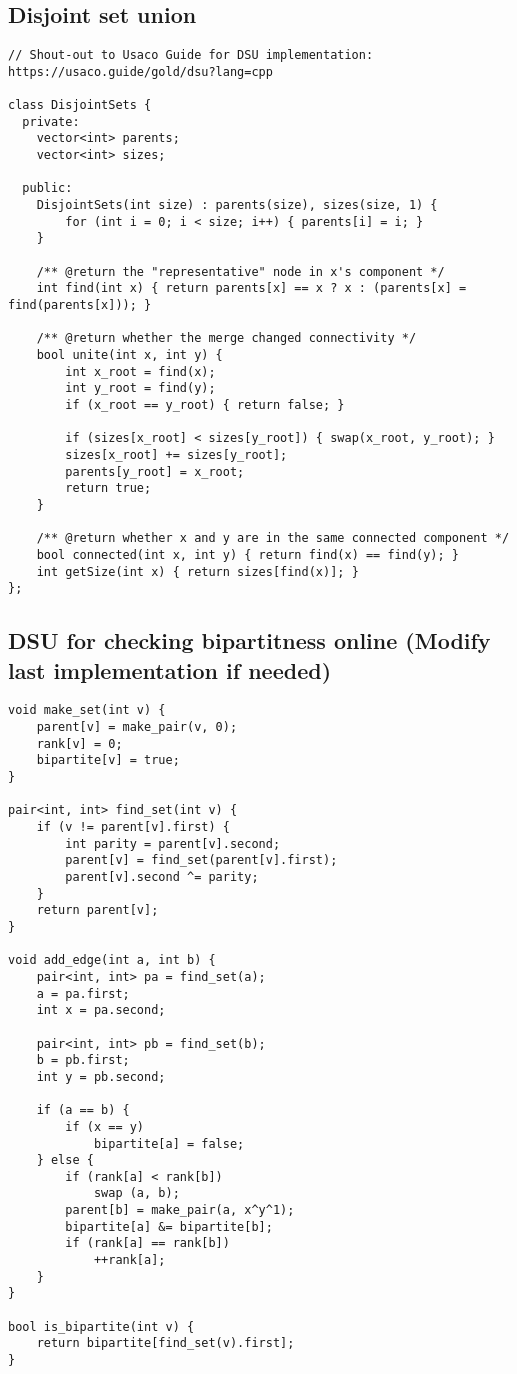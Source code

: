\documentclass{article}
\begin{document}
\subsection{Disjoint set union}
\begin{lstlisting}
// Shout-out to Usaco Guide for DSU implementation: https://usaco.guide/gold/dsu?lang=cpp
 
class DisjointSets {
  private:
	vector<int> parents;
	vector<int> sizes;

  public:
	DisjointSets(int size) : parents(size), sizes(size, 1) {
		for (int i = 0; i < size; i++) { parents[i] = i; }
	}

	/** @return the "representative" node in x's component */
	int find(int x) { return parents[x] == x ? x : (parents[x] = find(parents[x])); }

	/** @return whether the merge changed connectivity */
	bool unite(int x, int y) {
		int x_root = find(x);
		int y_root = find(y);
		if (x_root == y_root) { return false; }

		if (sizes[x_root] < sizes[y_root]) { swap(x_root, y_root); }
		sizes[x_root] += sizes[y_root];
		parents[y_root] = x_root;
		return true;
	}

	/** @return whether x and y are in the same connected component */
	bool connected(int x, int y) { return find(x) == find(y); }
    int getSize(int x) { return sizes[find(x)]; }
};
\end{lstlisting}
\subsection{DSU for checking bipartitness online (Modify last implementation if needed)}
\begin{lstlisting}
void make_set(int v) {
    parent[v] = make_pair(v, 0);
    rank[v] = 0;
    bipartite[v] = true;
}

pair<int, int> find_set(int v) {
    if (v != parent[v].first) {
        int parity = parent[v].second;
        parent[v] = find_set(parent[v].first);
        parent[v].second ^= parity;
    }
    return parent[v];
}

void add_edge(int a, int b) {
    pair<int, int> pa = find_set(a);
    a = pa.first;
    int x = pa.second;

    pair<int, int> pb = find_set(b);
    b = pb.first;
    int y = pb.second;

    if (a == b) {
        if (x == y)
            bipartite[a] = false;
    } else {
        if (rank[a] < rank[b])
            swap (a, b);
        parent[b] = make_pair(a, x^y^1);
        bipartite[a] &= bipartite[b];
        if (rank[a] == rank[b])
            ++rank[a];
    }
}

bool is_bipartite(int v) {
    return bipartite[find_set(v).first];
}
\end{lstlisting}
\end{document}
